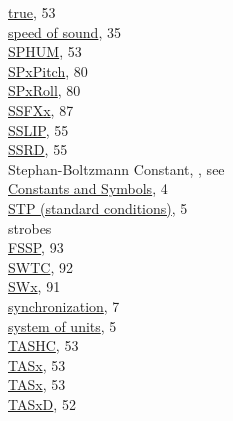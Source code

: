 \documentclass[
]{book}
\begin{document}
\hspace*{0.333em}\hspace*{0.333em}\hspace*{0.333em}\hspace*{0.333em}\href{./4-the-state-of-the-atmosphere.html\#true-airspeed}{true}, 53\\
\href{./4-the-state-of-the-atmosphere.html\#ATX}{speed of sound}, 35\\
\href{./4-the-state-of-the-atmosphere.html\#sphum}{SPHUM}, 53\\
\href{./8-radiation-variables.html\#spx}{SPxPitch}, 80\\
\href{./8-radiation-variables.html\#spx}{SPxRoll}, 80\\
\href{./10-obsolete-variables.html\#akfxx}{SSFXx}, 87\\
\href{./4-the-state-of-the-atmosphere.html\#sslip}{SSLIP}, 55\\
\href{./4-the-state-of-the-atmosphere.html\#ssrd}{SSRD}, 55\\
Stephan-Boltzmann Constant, , see\\
\hspace*{0.333em}\hspace*{0.333em}\href{./1-introduction.html\#constants-and-symbols}{Constants and Symbols}, 4\\
\href{./2-general-information-about-data-files.html\#units-and-abbreviations}{STP (standard conditions)}, 5\\
strobes\\
\hspace*{0.333em}\hspace*{0.333em}\href{./10-obsolete-variables.html\#fstrob}{FSSP}, 93\\
\href{./10-obsolete-variables.html\#swtc}{SWTC}, 92\\
\href{./10-obsolete-variables.html\#swx}{SWx}, 91\\
\href{./2-general-information-about-data-files.html\#synchronization-of-measurements}{synchronization}, 7\\
\href{./2-general-information-about-data-files.html\#units-and-abbreviations}{system of units}, 5\\
\href{./4-the-state-of-the-atmosphere.html\#tashc}{TASHC}, 53\\
\href{./4-the-state-of-the-atmosphere.html\#true-airspeed\%7C}{TASx}, 53\\
\href{./4-the-state-of-the-atmosphere.html\#true-airspeed}{TASx}, 53\\
\href{./4-the-state-of-the-atmosphere.html\#true-airspeed}{TASxD}, 52\\
\end{document}
